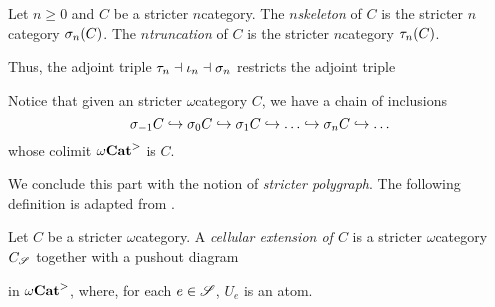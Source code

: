\begin{dfn}
    Let \( n \geq 0 \) and \( C \) be a stricter \( n \)\nbd category.
    The \emph{\( n \)\nbd skeleton} of \( C \) is the stricter \( n \)\nbd category \( \sigma_{n}(C) \).
    The \emph{\( n \)\nbd truncation} of \( C \) is the stricter \( n \)\nbd category \( \tau_{n}(C) \).
\end{dfn}

\noindent Thus, the adjoint triple \( \tau_{n} \dashv \iota_n \dashv \sigma_{n} \) restricts the adjoint triple
\begin{center}
\end{center}
Notice that given an stricter \( \omega \)\nbd category \( C \), we have a chain of inclusions 
\begin{equation*}
    \sigma_{-1} C \hookrightarrow \sigma_{0} C \hookrightarrow \sigma_{1} C \hookrightarrow \ldots \hookrightarrow \sigma_{n} C \hookrightarrow \ldots
\end{equation*}
whose colimit \( {\omega\mathbf{Cat}}^> \) is \( C \).

We conclude this part with the notion of \emph{stricter polygraph}. 
The following definition is adapted from \cite[8.2.1]{hadzihasanovic2024combinatorics}.

\begin{dfn}  \label{dfn:cellular_extension}
    Let \( C \) be a stricter \( \omega \)\nbd category.
    A \emph{cellular extension of \( C \)} is a stricter \( \omega \)\nbd category \( C_{\mathscr{S}} \) together with a pushout diagram 
    \begin{center}
    \end{center}
    in \( {\omega\mathbf{Cat}}^> \), where, for each \( e \in \mathscr{S} \), \( U_e \) is an atom.
\end{dfn}

